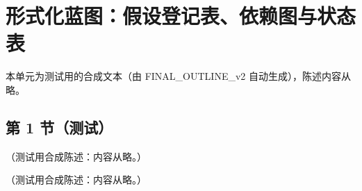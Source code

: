 \chapter{形式化蓝图：假设登记表、依赖图与状态表}\label{app:appP}
本单元为测试用的合成文本（由 FINAL\_OUTLINE\_v2 自动生成），陈述内容从略。

\section{第 1 节（测试）}\label{sec:appP-intro}

\begin{definition}[内容等级]\label{def:appP-content-grade}
（测试用合成陈述：内容从略。）
\end{definition}

\begin{remark}\label{rem:appP-limits}
（测试用合成陈述：内容从略。）
\end{remark}
